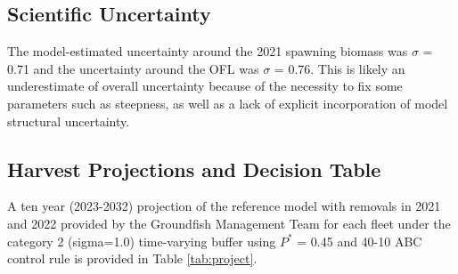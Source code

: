 \documentclass[11pt,
  english,
  a4paper,
]{article}
\begin{document}
\leavevmode\tagmcend\tagstructend\par


\hypertarget{scientific-uncertainty}{%
\subsection*{Scientific Uncertainty}\label{scientific-uncertainty}}

\leavevmode\tagmcend\tagstructend


The model-estimated uncertainty around the 2021 spawning biomass was {\(\sigma\)\leavevmode\tagmcend\tagstructend} = 0.71 and the uncertainty around the OFL was {\(\sigma\)\leavevmode\tagmcend\tagstructend} = 0.76. This is likely an underestimate of overall uncertainty because of the necessity to fix some parameters such as steepness, as well as a lack of explicit incorporation of model structural uncertainty.

\leavevmode\tagmcend\tagstructend\par


\hypertarget{harvest-projections-and-decision-table}{%
\subsection*{Harvest Projections and Decision Table}\label{harvest-projections-and-decision-table}}

\leavevmode\tagmcend\tagstructend


A ten year (2023-2032) projection of the reference model with removals in 2021 and 2022 provided by the Groundfish Management Team for each fleet under the category 2 (sigma=1.0) time-varying buffer using {\(P^*\)\leavevmode\tagmcend\tagstructend} = 0.45 and 40-10 ABC control rule is provided in Table \ref{tab:project}.

\leavevmode\tagmcend\tagstructend\par
\end{document}
